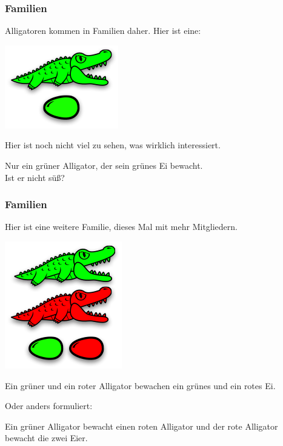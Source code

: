 \documentclass{beamer}
\begin{document}
\begin{frame}
\frametitle{Familien}

Alligatoren kommen in Familien daher. Hier ist eine:

\begin{multicols}{2}

\begin{center}
\includegraphics[scale=0.6]{families_1.png} 
\end{center}

\columnbreak
\pause

Hier ist noch nicht viel zu sehen, was wirklich interessiert.\smallskip\smallskip

Nur ein grüner Alligator, der sein grünes Ei bewacht.\\Ist er nicht süß?

\end{multicols}

\end{frame}


\begin{frame}
\frametitle{Familien}

Hier ist eine weitere Familie, dieses Mal mit mehr Mitgliedern.\pause

\begin{multicols}{2}

\begin{center}
\includegraphics[scale=0.6]{families_2.png} 
\end{center}

\columnbreak

Ein grüner und ein roter Alligator bewachen ein grünes und ein rotes Ei.\bigskip

Oder anders formuliert:

Ein grüner Alligator bewacht einen roten Alligator und der rote Alligator bewacht die zwei Eier.

\end{multicols}

\end{frame}
\end{document}
